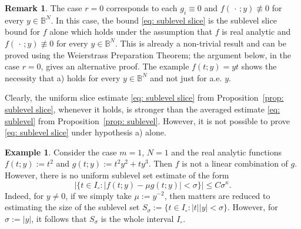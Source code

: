 \documentclass[reqno]{amsart}
\numberwithin{equation}{section}
\newcommand{\B}{\mathbb{B}}
\newcommand{\R}{\mathbb{R}}
\theoremstyle{plain}
\theoremstyle{definition}
\newtheorem{example}[theorem]{Example}
\newtheorem{remark}[theorem]{Remark}
\newcommand{\dist}{\mathrm{dist}}
\begin{document}
\begin{remark} The case $r=0$ corresponds to each $g_i \equiv 0$ and $f(\,\cdot\,;y) \not\equiv 0$ for every $y\in \B^N$. In this case, the bound \eqref{eq: sublevel slice} is the sublevel slice bound for $f$ alone which holds under the assumption that $f$ is real analytic and $f(\,\cdot\,;y) \not\equiv 0$ for every $y\in \B^N$. This is already a non-trivial result and can be proved using the Weierstrass Preparation Theorem; the argument below, in the case $r=0$, gives an alternative proof. The example $f(t;y) = y t$ shows the necessity that a) holds for every $y\in \B^N$ and not just for a.e. $y$.
\end{remark}

Clearly, the uniform slice estimate \eqref{eq: sublevel slice} from Proposition~\ref{prop: sublevel slice}, whenever it holds, is stronger than the averaged estimate \eqref{eq: sublevel} from Proposition~\ref{prop: sublevel}. However, it is not possible to prove \eqref{eq: sublevel slice} under hypothesis a) alone.

\begin{example} Consider the case $m = 1$, $N=1$ and the real analytic functions $f(t;y) := t^2$ and $g(t;y) := t^2y^2 + ty^3$. Then $f$ is not a linear combination of $g$. However, there is no uniform sublevel set estimate of the form
\begin{equation*}
    \Big|\Big\{t \in I_{\circ} : \big|f(t;y) - \mu g(t;y)\big| < \sigma\Big\}\Big| \leq C \sigma^{\kappa}.
\end{equation*}
Indeed, for $y \neq 0$, if we simply take $\mu := y^{-2}$, then matters are reduced to estimating the size of the sublevel set $S_{\sigma} := \{ t \in I_{\circ} : |t||y| < \sigma\}$. However, for $\sigma := |y|$, it follows that $S_{\sigma}$ is the whole interval $I_{\circ}$.  
\end{example}



\end{document}
